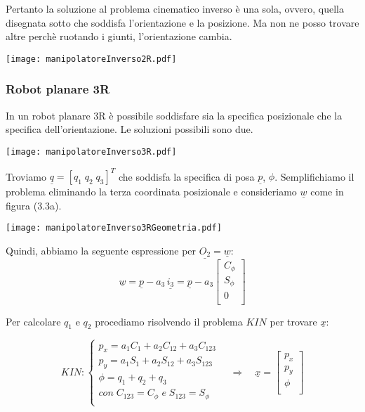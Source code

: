 Pertanto la soluzione al problema cinematico inverso è una sola, ovvero, quella disegnata sotto che soddisfa l'orientazione e la posizione. Ma non ne posso trovare altre perchè ruotando i giunti, l'orientazione cambia.

\begin{center}
\texttt{[image: manipolatoreInverso2R.pdf]}
\end{center}

\subsubsection{Robot planare 3R}
In un robot planare 3R è possibile soddisfare sia la specifica posizionale che la specifica dell'orientazione. Le soluzioni possibili sono due.

\begin{center}
\texttt{[image: manipolatoreInverso3R.pdf]}
\end{center}

Troviamo $\underline{q} = [q_1 \; q_2 \; q_3]^T$ che soddisfa la specifica di posa $\underline{p}$, $\phi$. Semplifichiamo il problema eliminando la terza coordinata posizionale e consideriamo $\underline{w}$ come in figura ($3.3$a).

\begin{center}
\texttt{[image: manipolatoreInverso3RGeometria.pdf]}
\end{center}

Quindi, abbiamo la seguente espressione per $\underline{O_2} = \underline{w}$:
\begin{equation*}
	\underline{w} = \underline{p} - a_3\,\underline{i_3} = \underline{p}-a_3
	\begin{bmatrix}
		C_{\phi} \\
		S_{\phi} \\
		0 \\
	\end{bmatrix}
\end{equation*}

Per calcolare $q_1$ e $q_2$ procediamo risolvendo il problema $KIN$ per trovare $\underline{x}$:

\begin{equation*}
	KIN:
	\begin{cases}
		p_x = a_1C_1 + a_2C_{12} + a_3C_{123} \\
		p_y = a_1S_1 + a_2S_{12} + a_3S_{123} \\
		\phi = q_1 + q_2 + q_3 \\
		con \; C_{123} = C_{\phi} \; e \; S_{123} = S_{\phi} \\
	\end{cases} \quad\Rightarrow\quad \underline{x} = 
	\begin{bmatrix}
		p_x \\
		p_y \\
		\phi \\
	\end{bmatrix}
\end{equation*}

